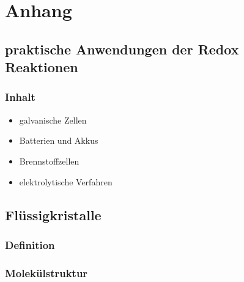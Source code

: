\section{Anhang}

\subsection{praktische Anwendungen der Redox Reaktionen}

\subsubsection{Inhalt} %
\begin{itemize}
	\item galvanische Zellen
	\item  Batterien und Akkus
	\item  Brennstoffzellen
	\item  elektrolytische Verfahren
	

\end{itemize}

\subsection{Flüssigkristalle}

\subsubsection{Definition}

\subsubsection{Molekülstruktur}

